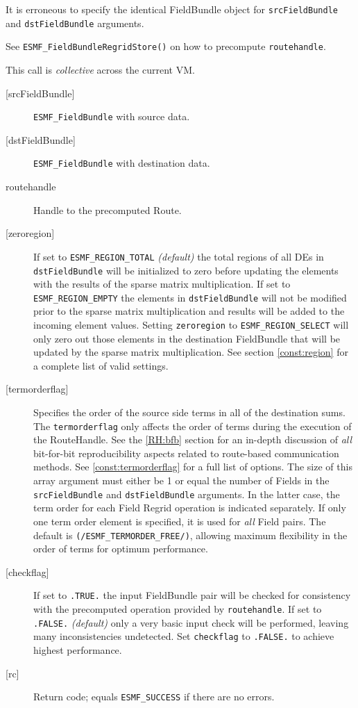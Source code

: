    It is erroneous to specify the identical FieldBundle object for {\tt srcFieldBundle} and
   {\tt dstFieldBundle} arguments.
  
   See {\tt ESMF\_FieldBundleRegridStore()} on how to precompute
   {\tt routehandle}.
  
   This call is {\em collective} across the current VM.
  
   \begin{description}
   \item [{[srcFieldBundle]}]
   {\tt ESMF\_FieldBundle} with source data.
   \item [{[dstFieldBundle]}]
   {\tt ESMF\_FieldBundle} with destination data.
   \item [routehandle]
   Handle to the precomputed Route.
   \item [{[zeroregion]}]
   \begin{sloppypar}
   If set to {\tt ESMF\_REGION\_TOTAL} {\em (default)} the total regions of
   all DEs in {\tt dstFieldBundle} will be initialized to zero before updating the
   elements with the results of the sparse matrix multiplication. If set to
   {\tt ESMF\_REGION\_EMPTY} the elements in {\tt dstFieldBundle} will not be
   modified prior to the sparse matrix multiplication and results will be
   added to the incoming element values. Setting {\tt zeroregion} to
   {\tt ESMF\_REGION\_SELECT} will only zero out those elements in the
   destination FieldBundle that will be updated by the sparse matrix
   multiplication. See section \ref{const:region} for a complete list of
   valid settings.
   \end{sloppypar}
   \item [{[termorderflag]}]
   Specifies the order of the source side terms in all of the destination
   sums. The {\tt termorderflag} only affects the order of terms during
   the execution of the RouteHandle. See the \ref{RH:bfb} section for an
   in-depth discussion of {\em all} bit-for-bit reproducibility
   aspects related to route-based communication methods.
   See \ref{const:termorderflag} for a full list of options.
   The size of this array argument must either be 1 or equal the number of
   Fields in the {\tt srcFieldBundle} and {\tt dstFieldBundle} arguments. In
   the latter case, the term order for each Field Regrid operation is
   indicated separately. If only one term order element is specified, it is
   used for {\em all} Field pairs.
   The default is {\tt (/ESMF\_TERMORDER\_FREE/)}, allowing maximum
   flexibility in the order of terms for optimum performance.
   \item [{[checkflag]}]
   If set to {\tt .TRUE.} the input FieldBundle pair will be checked for
   consistency with the precomputed operation provided by {\tt routehandle}.
   If set to {\tt .FALSE.} {\em (default)} only a very basic input check
   will be performed, leaving many inconsistencies undetected. Set
   {\tt checkflag} to {\tt .FALSE.} to achieve highest performance.
   \item [{[rc]}]
   Return code; equals {\tt ESMF\_SUCCESS} if there are no errors.
   \end{description}
   
